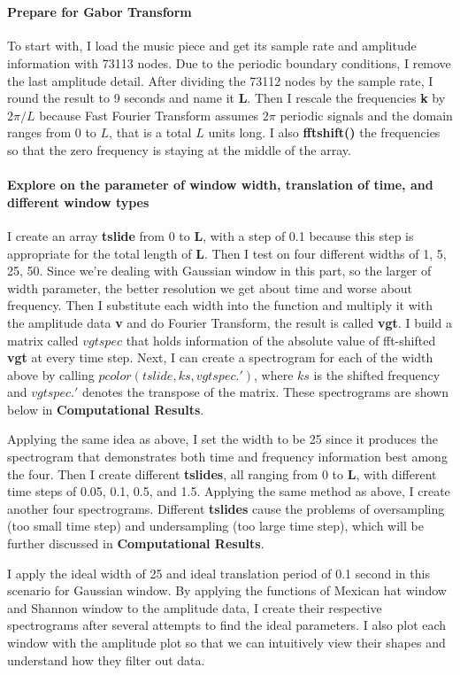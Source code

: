 \documentclass[10pt]{article}
\begin{document}
\part{}
\subsection*{Prepare for Gabor Transform}
To start with, I load the music piece and get its sample rate and amplitude information with 73113 nodes. Due to the periodic boundary conditions, I remove the last amplitude detail. After dividing the 73112 nodes by the sample rate, I round the result to 9 seconds and name it \textbf{L}. Then I rescale the frequencies \textbf{k} by $2{\pi}/L$ because Fast Fourier Transform assumes $2{\pi}$ periodic signals and the domain ranges from 0 to $L$, that is a total $L$ units long. I also \textbf{fftshift()} the frequencies so that the zero frequency is staying at the middle of the array. 
\vskip 0.5cm

\subsection*{Explore on the parameter of window width, translation of time, and different window types}
I create an array \textbf{tslide} from 0 to \textbf{L}, with a step of 0.1 because this step is appropriate for the total length of \textbf{L}. Then I test on four different widths of 1, 5, 25, 50. Since we're dealing with Gaussian window in this part, so the larger of width parameter, the better resolution we get about time and worse about frequency.
Then I substitute each width into the function and multiply it with the amplitude data \textbf{v} and do Fourier Transform, the result is called \textbf{vgt}. I build a matrix called $vgtspec$ that holds information of the absolute value of fft-shifted \textbf{vgt} at every time step. Next, I can create a spectrogram for each of the width above by calling $pcolor(tslide, ks, vgt spec.')$, where $ks$ is the shifted frequency and $vgt spec.'$ denotes the transpose of the matrix. These spectrograms are shown below in \textbf{Computational Results}.
\par
\vskip 0.1cm
Applying the same idea as above, I set the width to be 25 since it produces the spectrogram that demonstrates both time and frequency information best among the four. Then I create different \textbf{tslides}, all ranging from 0 to \textbf{L}, with different time steps of 0.05, 0.1, 0.5, and 1.5. Applying the same method as above, I create another four spectrograms. Different \textbf{tslides} cause the problems of oversampling (too small time step) and undersampling (too large time step), which will be further discussed in \textbf{Computational Results}.
\par
\vskip 0.1cm
I apply the ideal width of 25 and ideal translation period of 0.1 second in this scenario for Gaussian window. By applying the functions of Mexican hat window and Shannon window to the amplitude data, I create their respective spectrograms after several attempts to find the ideal parameters. I also plot each window with the amplitude plot so that we can intuitively view their shapes and understand how they filter out data.
\end{document}
